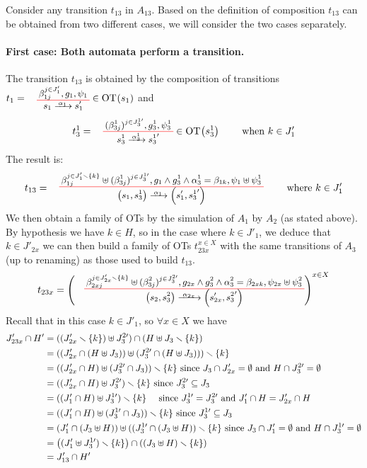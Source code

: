 \documentclass[runningheads]{llncs}
\begin{document}
\begin{enumerate}
Consider any transition $t_{13}$ in $A_{13}$.  Based on  the definition of composition $t_{13}$ can be obtained from two different cases, we will consider the two cases separately. 


\paragraph{First case: Both automata perform a transition.}
The transition $t_{13}$ is obtained by the composition of  transitions $t_1=\OTx{1}{}{1}{1}\in \fOT{s_1}$ and  \[t_3^1=
\OT{ s^1_3}{{s^1_3}'}{\alpha_3^1}{   {(\beta^1_{3j})^{j \in J^{1 \prime}_3} }}{ g^1_3 }{ \psi^1_3}\in \fOT{s^1_3} \qquad \text{ when } k \in J'_{1} 
\] The result is:
\[
t_{13} = \OT{\mpar{s_1, s^1_3}}{\mpar{s'_1, {s^1_3}'}}{\alpha_1}{\beta_{1j}^{j \in J'_1 \setminus \{k\}} \uplus  {(\beta^1_{3j})^{j \in J^{1 \prime}_3} }}{g_1 \wedge g^1_3 \wedge \alpha^1_3 = \beta_{1k}}{\psi_1 \uplus \psi^1_3} \qquad \text{ where } k \in J'_{1} 
\]
We then obtain a family of OTs by the simulation of $A_1$ by $A_2$ (as stated above).
By hypothesis we have $k \in H$, so in the case where $k \in J'_{1}$, we deduce that $k \in J'_{2x}$ we can  then build  a family of OTs $t_{23x}^{x\in X}$ with the same transitions of $A_3$ (up to renaming) as those used to build $t_{13}$.
\[
t_{23x} = \left(\OT{\mpar{s_2, s^2_3}}{\mpar{s'_{2x}, {s^2_3}'}}{\alpha_{2x}}{\beta_{2xj}^{j \in J'_{2x}  \setminus \{k\}} \uplus   {(\beta^2_{3j})^{j \in J^{2 \prime}_3} }}{g_{2x} \wedge g^2_3 \wedge \alpha^2_3 = \beta_{2xk}}{\psi_{2x} \uplus \psi^2_3}
\right)^{x\in X}\]
Recall that in this case  $k \in J'_{1}$, so $\forall x \in X$ we have
\begin{align*}
  J'_{23x} \cap H'  
&=((J'_{2x}  \smallsetminus {\left\{k\right\}})\uplus J^{2 \prime}_{3} ) \cap (H\uplus J_3 \smallsetminus\{k\} )\\
&=((J'_{2x}\cap (H\uplus J_3))\uplus (J^{2 \prime}_{3}\cap (H\uplus J_3)))\smallsetminus {\left\{k\right\}}\\
&=((J'_{2x}\cap H)\uplus (J^{2 \prime}_{3}\cap  J_3))\smallsetminus {\left\{k\right\}}\text{ since } J_3\cap J'_{2x} = \emptyset \text{ and } H\cap J^{2 \prime}_{3} = \emptyset\\
& =((J'_{2x}\cap H)\uplus J^{2 \prime}_{3})\smallsetminus {\left\{k\right\}}\text{ since } J^{2 \prime}_{3}\subseteq J_3\\
& =((J'_1\cap H)\uplus J^{1 \prime}_{3})\smallsetminus {\left\{k\right\}}\quad \text{ since } J^{1 \prime}_{3}=J^{2 \prime}_{3} \text{ and } J'_1 \cap H = J'_{2x} \cap H\\
&= ((J'_1 \cap H) \uplus (J^{1 \prime}_{3} \cap J_3)) \smallsetminus {\left\{k\right\}}\text{ since } J^{1 \prime}_{3}\subseteq J_3\\ 
& = (J'_1\cap (J_3 \uplus H)) \uplus ((J^{1 \prime}_{3} \cap (J_3 \uplus H)) \smallsetminus {\left\{k\right\}} \text{ since } J_3\cap J'_{1} = \emptyset \text{ and } H\cap J^{1 \prime}_{3} = \emptyset\\
		& = {\left((J'_1  \uplus J^{1 \prime}_{3})\smallsetminus {\left\{k\right\}}\right)} \cap {\left((J_{3} \uplus H) \smallsetminus{\left\{k\right\}}\right)}\\
		& = J'_{13} \cap H'
\end{align*}	


\end{enumerate}
\end{document}
